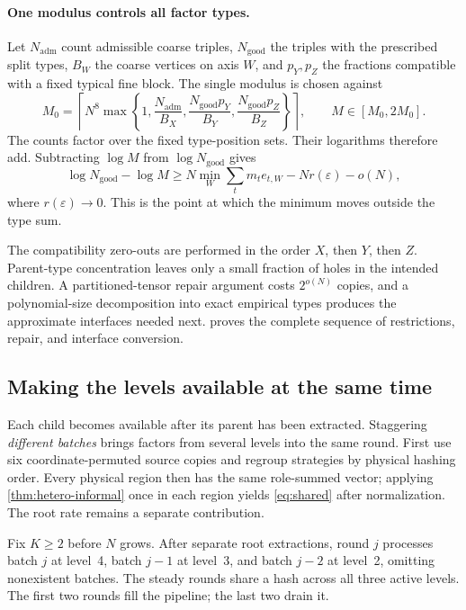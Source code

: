 \documentclass[11pt,a4paper]{article}
\newcommand{\Ngood}{N_{\mathrm{good}}}
\newcommand{\Nadm}{N_{\mathrm{adm}}}
\newcommand{\eps}{\varepsilon}
\begin{document}
\paragraph{One modulus controls all factor types.}
Let $\Nadm$ count admissible coarse triples, $\Ngood$ the triples with the prescribed split types, $B_W$ the coarse vertices on axis $W$, and $p_Y,p_Z$ the fractions compatible with a fixed typical fine block. The single modulus is chosen against
\begin{equation}\label{eq:modulus}
M_0=\left\lceil N^8\max\left\{1,\frac{\Nadm}{B_X},
\frac{\Ngood p_Y}{B_Y},\frac{\Ngood p_Z}{B_Z}\right\}\right\rceil,
\qquad M\in[M_0,2M_0].
\end{equation}
The counts factor over the fixed type-position sets. Their logarithms therefore add. Subtracting $\log M$ from $\log\Ngood$ gives
\begin{equation}\label{eq:rate-mechanism}
\log\Ngood-\log M
\ge N\min_W\sum_t m_t e_{t,W}-Nr(\eps)-o(N),
\end{equation}
where $r(\eps)\to0$. This is the point at which the minimum moves outside the type sum.

The compatibility zero-outs are performed in the order $X$, then $Y$, then $Z$. Parent-type concentration leaves only a small fraction of holes in the intended children. A partitioned-tensor repair argument costs $2^{o(N)}$ copies, and a polynomial-size decomposition into exact empirical types produces the approximate interfaces needed next.  proves the complete sequence of restrictions, repair, and interface conversion.

\subsection{Making the levels available at the same time}\label{sec:pipeline}

Each child becomes available after its parent has been extracted. Staggering \emph{different batches} brings factors from several levels into the same round. First use six coordinate-permuted source copies and regroup strategies by physical hashing order. Every physical region then has the same role-summed vector; applying \cref{thm:hetero-informal} once in each region yields \cref{eq:shared} after normalization. The root rate remains a separate contribution.

Fix $K\ge2$ before $N$ grows. After separate root extractions, round $j$ processes batch $j$ at level~4, batch $j-1$ at level~3, and batch $j-2$ at level~2, omitting nonexistent batches. The steady rounds share a hash across all three active levels. The first two rounds fill the pipeline; the last two drain it.
\end{document}

